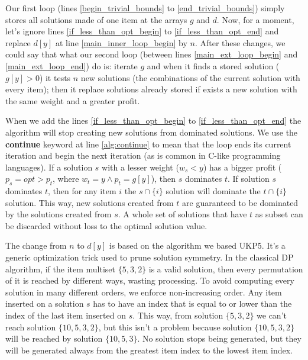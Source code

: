 \documentclass[runningheads,a4paper]{llncs}
\begin{document}
Our first loop (lines \ref{begin_trivial_bounds} to \ref{end_trivial_bounds}) simply stores all solutions made of one item at the arrays \(g\) and \(d\). Now, for a moment, let's ignore lines \ref{if_less_than_opt_begin} to \ref{if_less_than_opt_end} and replace \(d[y]\) at line \ref{main_inner_loop_begin} by \(n\). After these changes, we could say that what our second loop (between lines \ref{main_ext_loop_begin} and \ref{main_ext_loop_end}) do is: iterate \(g\) and when it finds a stored solution (\(g[y] > 0\)) it tests \(n\) new solutions (the combinations of the current solution with every item); then it replace solutions already stored if exists a new solution with the same weight and a greater profit.

When we add the lines \ref{if_less_than_opt_begin} to \ref{if_less_than_opt_end} the algorithm will stop creating new solutions from dominated solutions. We use the \textbf{continue} keyword at line \ref{alg:continue} to mean that the loop ends its current iteration and begin the next iteration (as is common in C-like programming languages). If a solution \(s\) with a lesser weight (\(w_s < y\)) has a bigger profit (\(p_s = opt > p_t\), where \(w_t = y \land p_t = g[y]\)), then \(s\) dominates \(t\). If solution \(s\) dominates \(t\), then for any item \(i\) the \(s \cap \{i\}\) solution will dominate the \(t \cap \{i\}\) solution. This way, new solutions created from \(t\) are guaranteed to be dominated by the solutions created from \(s\). A whole set of solutions that have \(t\) as subset can be discarded without loss to the optimal solution value. 

The change from \(n\) to \(d[y]\) is based on the algorithm we based UKP5. It's a generic optimization trick used to prune solution symmetry. In the classical DP algorithm, if the item multiset \(\{5, 3, 2\}\) is a valid solution, then every permutation of it is reached by different ways, wasting processing. To avoid computing every solution in many different orders, we enforce non-increasing order. Any item inserted on a solution \(s\) has to have an index that is equal to or lower than the index of the last item inserted on \(s\). This way, from solution \(\{5, 3, 2\}\) we can't reach solution \(\{10, 5, 3, 2\}\), but this isn't a problem because solution \(\{10, 5, 3, 2\}\) will be reached by solution \(\{10, 5, 3\}\). No solution stops being generated, but they will be generated always from the greatest item index to the lowest item index.
\end{document}
